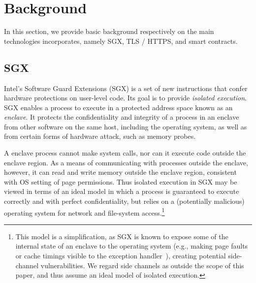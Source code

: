 \section{Background}
\label{sec:background}

In this section, we provide basic background respectively on the main technologies \tc incorporates, namely SGX, TLS / HTTPS, and smart contracts.

\subsection{SGX}
Intel's Software Guard Extensions (SGX) is a set of new instructions that confer hardware protections on user-level code. Its goal is to provide \emph{isolated execution}. SGX enables a process to execute in a protected address space known as an {\em enclave}. It protects the confidentiality and integrity of a process in an enclave from other software on the same host, including the operating system, as well as from certain forms of hardware attack, such as memory probes. 

A enclave process cannot make system calls, nor can it execute code outside the enclave region. As a means of communicating with processes outside the enclave, however, it can read and write memory outside the enclave region, consistent with OS setting of page permissions. Thus  isolated execution in SGX may be viewed in terms of an ideal model in which a process is guaranteed to execute correctly and with perfect confidentiality, but relies on a (potentially malicious) operating system for network and file-system access.\footnote{This model is a simplification, as SGX is known to expose some of the internal state of an enclave to the operating system (e.g., making page faults or cache timings visible to the exception handler~\cite{sgxexplained}), creating potential side-channel vulnerabilities. We regard side channels as outside the scope of this paper, and thus assume an ideal model of isolated execution.}

